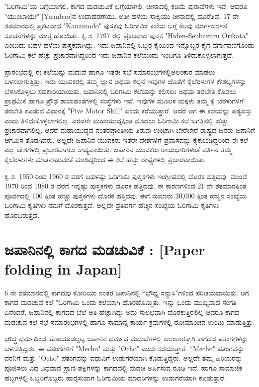 'ಓರಿಗಾಮಿ'ಯ ಬಗ್ಗೆಯಾಗಲಿ, ಕಾಗದ ಮಡಚುವಿಕೆ ಬಗ್ಗೆಯಾಗಲಿ, ಚೀನಾದಲ್ಲಿ ಕಡಿಮೆ ಪುರಾವೆಗಳು ಇವೆ. ಆದರೂ "ಯುಂಬಾಯೇ" [Yuanbao]ನ ಉದಾಹರಣೆಯು. ಅತೀ ಹಳೆಯ ಸಾಕ್ಷಿಯು ಚೀನಾದಲ್ಲಿ ದೊರೆತಿದೆ. 17 ನೇ ಶತಮಾನದಲ್ಲಿ ಪ್ರಕಟವಾದ "Kanamodo" ಪುಸ್ತಕವು ಓರಿಗಾಮೀ ಕಲೆಯ ಬಗ್ಗೆ ಕೆಲವು ಮಾರ್ಗದರ್ಶನ ಸೂಚನೆಗ\break ಳನ್ನು ಮಾತ್ರ ಹೊಂದಿತ್ತು. ಕಿೃ.ಶ. 1797 ರಲ್ಲಿ ಪ್ರಕಟವಾದ ಪುಸ್ತಕ  "Hiden-Senbazuru Orikata" ಎಂಬುದು ಬಹಳ ಹಳೆಯ ಪುಸ್ತಕವಾಗಿದ್ದು. ಇದು ಜಪಾನಿನಲ್ಲಿ ಒಬ್ಬರ  ಕೈಯಿಂದ ಇನ್ನೊಬ್ಬರ ಕೈಗೆ ವರ್ಗಾವಣಿಗೊಂಡು ಓರಿಗಾಮಿ ಕಲೆ ಹೆಚ್ಚು ಪ್ರಚಾರವಾಗಿದ್ದರಿಂದ ಇದು ಜಪಾನಿನ ಕಲೆಯಂದು ಇಂದಿಗೂ ತಿಳಿದುಕೊಳ್ಳಲಾಗುತ್ತದೆ. 


ಪ್ರಾರಂಭದಲ್ಲಿ ಈ ಕಲೆಯನ್ನು ಮದುವೆ ಹಾಗೂ ಇತರೇ ಸಭೆ ಸಮಾರಂಭಗಳಲ್ಲಿ\break ಅಲಂಕಾರ ಮಾಡಲು ಬಳಸಲಾಗುತ್ತಿತ್ತು. ಇದು ಯುವಕರಲ್ಲಿ ತಮ್ಮ ಜ್ಞಾನ ಅಥವಾ ಕಲ್ಪನೆ ಇವುಗಳ ಜೊತೆಗೆ ಕೈಬೆರಳುಗಳ ಕೌಶಲ್ಯಗಳನ್ನು ಬೆಳಸಿಕೊಳ್ಳಲು ಸಹಕಾರಿಯಾಯಿತು. ಜಪಾನಿನಲ್ಲಿ ಓರಿಗಾಮಿ ಕಲೆಯನ್ನು ಕಲಿಸಲು ಅಥವಾ ತರಬೇತಿ ಕೊಡಲು ಪ್ರಾಥಮಿಕ ಹಾಗೂ ಪ್ರೌಢ ಶಾಲಾಹಂತಗಳಲ್ಲಿ ಸಂಸ್ಥೆಗಳು ಇವೆ. ಇವುಗಳ ಮೂಲಕ ಮಕ್ಕಳು ತಮ್ಮ ಕೈ ಬೆರಳುಗಳಿಗೆ ತರಬೇತಿ ಕೊಡುವ ವಿಧಾನಕ್ಕೆ "Five Motor Skill" ಎಂದು ಕರೆಯುತ್ತಾರೆ. ಆದರೆ ಆಗ ಈ ಕಲೆಯನ್ನು ಪಠ್ಯವಸ್ತು ಎಂದು ತಿಳಿದುಕೊಳ್ಳಲಾಗಲಿಲ್ಲ. ಎರಡನೇ ಮಹಾಯುದ್ದಕ್ಕಿಂತ ಮೊದಲು ಓರಿಗಾಮಿ ಕಲೆ ಜಗತ್ತಿನಲ್ಲಿ ಹೆಚ್ಚು ಪ್ರಚಾರವಾಗಲಿಲ್ಲ. ಆದರೆ ಮಹಾಯುದ್ಧದ ನಂತರ\break ಪ್ರಾಂತೀಯ ತಿರುವು ಉಂಟಾಗಿ ಬೇರೆಬೇರೆ ರಾಷ್ಟ್ರದ ಜನರು ಜಪಾನಿಗೆ ಆಗಮಿಸ ತೊಡಗಿದರು. ಅಲ್ಲದೇ  ಜಪಾನಿನ ಯುವಕರು ಇತರೇ ದೇಶಗಳಿಗೆ ಪ್ರವಾಸವನ್ನು ಕೈಕೊಂಡಿದ್ದರಿಂದ ಈ ಕಲೆ ಎಲ್ಲ ದೇಶಗಳಲ್ಲಿ ಪ್ರಚಾರವಾಗಲು ಸಾಧ್ಯವಾಯಿತು. ಜಪಾನಿನ ಯುವಕರು ರಾಯಭಾರಿಗಳಂತೆ ವರ್ತಿನೆ ತಮ್ಮ ಕೈಬೆರಳುಗಳು ಮಾತನಾಡುವಂತೆ ಮಾಡಿದ್ದರಿಂದ ಈ ಕಲೆ ಹೆಚ್ಚು ರಾಷ್ಟ್ರಗಳಲ್ಲಿ ಪ್ರಚಾರವಾಯಿತು. 


ಕಿೃ.ಶ. 1950 ರಿಂದ 1960 ರ ವರಗೆ ಬಹಳಷ್ಟು ಓರಿಗಾಮಿ ಪುಸ್ತಕಗಳು ಇಂಗ್ಲೀಷದಲ್ಲಿ ದೊರಕ ಹತ್ತಿದವು. ಮುಂದೆ 1970 ರಿಂದ 1980 ರ ವರೆಗೆ ಇನ್ನಷ್ಟು ಪುಸ್ತಕಗಳು ದೊರಕ ಹತ್ತಿದವು. ಈ ಕಾರಣಗಳಿಂದ 21 ನೇ ಶತಮಾನಕ್ಕಿಂತ ಪೂರ್ವದಲ್ಲಿ 100 ಕ್ಕಿಂತ ಹೆಚ್ಚು ಪುಸ್ತಕಗಳು ದೊರಕ ಹತ್ತಿದವು. ಈಗ ಸುಮಾರು 30,000 ಕ್ಕಿಂತ ಹೆಚ್ಚಿನ ಸಂಖ್ಯೆಯ ಓರಿಗಾಮಿ ಕೃತಿಗಳು ನಮಗೆ ದೊರಕುತ್ತವೆ. ಅಲ್ಲದೇ ಪ್ರತಿವರ್ಗ ಹೆಚ್ಚಿನ ಸಂಖ್ಯೆಯ ಓರಿಗಾಮಿ ಕೃತಿಗಳು ಹೊರ\break ಬರುತ್ತದೆ. 

\section*{ಜಪಾನಿನಲ್ಲಿ ಕಾಗದ ಮಡಚುವಿಕೆ : [Paper folding in Japan]} 
6 ನೇ ಶತಮಾನದಲ್ಲಿ ಕಾಗದವು ಕೋರಿಯಾ ನಂತರ ಜಪಾನಿನಲ್ಲಿ ``ಭೌಧ್ಯ ಸನ್ಯಾಸಿ"ಗಳಿಂದ ಪರಿಚಯವಾಯಿತು. ಆಗ ಕಾಗದ ಮಡಚುವ ಕಲೆ "ಓರಿಗಾಮಿ ಒಂದು ಕಲೆಯಾಗಿ ಹೊರ\break  ಹೊಮ್ಮಿತು. ಇನ್ನು ಒಂದು ಮುಖ್ಯವಾದ ಸಂಗತಿ ಏನೆಂದರೆ, ಜಪಾನಿನಲ್ಲಿ ಕಾಗದದ ಬೆಲೆ ಅತಿ ಹೆಚ್ಚಾಗಿದ್ದು ಅದು ಸುಲಭವಾಗಿ ದೊರಕುತ್ತಿರಲಿಲ್ಲ ಆದರೂ ಕಾಗದ ಮಡಚುವ ಕಲೆ ಸಭೆ ಸಮಾರಂಭಗಳಲ್ಲಿ ಹಾಗೂ ಸಾಮಾನ್ಯ ಕಾರ್ಯ ಕ್ರಮಗಳಲ್ಲಿ ರೋಮಾಂಚನ ಉಂಟು ಮಾಡುತ್ತಿತ್ತು. 

ಭೌದ್ಧ ಧರ್ಮದಿಂದ ಹೊರದೂಡಲ್ಪಟ್ಟ ಜಪಾನಿನ ಧರ್ಮದ ಮದುವೆಗಳಲ್ಲಿ ಅಲಂಕಾರಕ್ಕಾಗಿ ಕಾಗದದ ಪತಂಗಗಳನ್ನು ಬಳಸುತ್ತಿದ್ದರು. ಈ ಪತಂಗಗಳಿಗೆ  "Mecho" ಮತ್ತು  "Ocho" ಎಂದು ಕರೆಯುತ್ತಾರೆ. ``Mecho" ಪತಂಗವನ್ನು ವರನಿಗೆ ಮತ್ತು "Ocho" ಪತಂಗವನ್ನು ವಧುವಿಗೆ ಉಡುಗರೆಯಾಗಿ ಕೊಡುತ್ತಿದ್ದರು. ಅಲ್ಲದೇ ತಮ್ಮ ಹಿರಿಯರನ್ನು ಪೂಜಿಸಲು ವಿಧ ವಿಧವಾದ ಪ್ರಾಣಿ-ಪಕ್ಷಿಗಳನ್ನು ಕಾಗದದಲ್ಲಿ ಮಡಚಿ ಅರ್ಪಿಸುವ ರೂಢಿ ಇದೆ. ಹಾಗೂ ಸಾಮಾಜಿಕ ಹಬ್ಬಗಳಲ್ಲಿ ಒಬ್ಬರಿಗೊಬ್ಬರು ಹಾರೈಸುವಾಗ ಓರಿಗಾಮಿಯ ಮಾದರಿಗಳನ್ನು ಉಡುಗರೆಯಾಗಿ ಕೊಡುತ್ತಾರೆ. 

